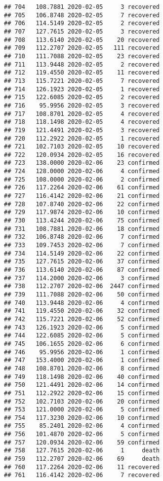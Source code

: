 \documentclass[
]{article}
\begin{document}
\begin{verbatim}
## 704   108.7881 2020-02-05     3 recovered
## 705   106.8748 2020-02-05     7 recovered
## 706   114.5149 2020-02-05     2 recovered
## 707   127.7615 2020-02-05     3 recovered
## 708   113.6140 2020-02-05    20 recovered
## 709   112.2707 2020-02-05   111 recovered
## 710   111.7088 2020-02-05    23 recovered
## 711   113.9448 2020-02-05     2 recovered
## 712   119.4550 2020-02-05    11 recovered
## 713   115.7221 2020-02-05     7 recovered
## 714   126.1923 2020-02-05     1 recovered
## 715   122.6085 2020-02-05     2 recovered
## 716    95.9956 2020-02-05     3 recovered
## 717   108.8701 2020-02-05     4 recovered
## 718   118.1498 2020-02-05     4 recovered
## 719   121.4491 2020-02-05     3 recovered
## 720   112.2922 2020-02-05     1 recovered
## 721   102.7103 2020-02-05    10 recovered
## 722   120.0934 2020-02-05    16 recovered
## 723   138.0000 2020-02-06    23 confirmed
## 724   128.0000 2020-02-06     4 confirmed
## 725   108.0000 2020-02-06     2 confirmed
## 726   117.2264 2020-02-06    61 confirmed
## 727   116.4142 2020-02-06    21 confirmed
## 728   107.8740 2020-02-06    22 confirmed
## 729   117.9874 2020-02-06    10 confirmed
## 730   113.4244 2020-02-06    75 confirmed
## 731   108.7881 2020-02-06    18 confirmed
## 732   106.8748 2020-02-06     7 confirmed
## 733   109.7453 2020-02-06     7 confirmed
## 734   114.5149 2020-02-06    22 confirmed
## 735   127.7615 2020-02-06    37 confirmed
## 736   113.6140 2020-02-06    87 confirmed
## 737   114.2000 2020-02-06     3 confirmed
## 738   112.2707 2020-02-06  2447 confirmed
## 739   111.7088 2020-02-06    50 confirmed
## 740   113.9448 2020-02-06     4 confirmed
## 741   119.4550 2020-02-06    32 confirmed
## 742   115.7221 2020-02-06    52 confirmed
## 743   126.1923 2020-02-06     5 confirmed
## 744   122.6085 2020-02-06     5 confirmed
## 745   106.1655 2020-02-06     6 confirmed
## 746    95.9956 2020-02-06     1 confirmed
## 747   153.4000 2020-02-06     1 confirmed
## 748   108.8701 2020-02-06     8 confirmed
## 749   118.1498 2020-02-06    40 confirmed
## 750   121.4491 2020-02-06    14 confirmed
## 751   112.2922 2020-02-06    15 confirmed
## 752   102.7103 2020-02-06    20 confirmed
## 753   121.0000 2020-02-06     5 confirmed
## 754   117.3230 2020-02-06    10 confirmed
## 755    85.2401 2020-02-06     4 confirmed
## 756   101.4870 2020-02-06     5 confirmed
## 757   120.0934 2020-02-06    59 confirmed
## 758   127.7615 2020-02-06     1     death
## 759   112.2707 2020-02-06    69     death
## 760   117.2264 2020-02-06    11 recovered
## 761   116.4142 2020-02-06     7 recovered

\end{verbatim}
\end{document}
